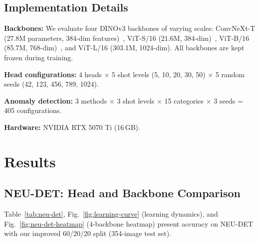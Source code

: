 \documentclass[journal]{IEEEtran}
\begin{document}
\subsection{Implementation Details}
\textbf{Backbones:} We evaluate four DINOv3 backbones of varying scales: ConvNeXt-T (27.8M parameters, 384-dim features)~\cite{ref38}, ViT-S/16 (21.6M, 384-dim)~\cite{ref3,ref9}, ViT-B/16 (85.7M, 768-dim)~\cite{ref3,ref9}, and ViT-L/16 (303.1M, 1024-dim). All backbones are kept frozen during training.

\textbf{Head configurations:} 4 heads $\times$ 5 shot levels (5, 10, 20, 30, 50) $\times$ 5 random seeds (42, 123, 456, 789, 1024).

\textbf{Anomaly detection:} 3 methods $\times$ 3 shot levels $\times$ 15 categories $\times$ 3 seeds = 405 configurations.

\textbf{Hardware:} NVIDIA RTX 5070 Ti (16\,GB).

\section{Results}

\subsection{NEU-DET: Head and Backbone Comparison}
Table~\ref{tab:neu-det}, Fig.~\ref{fig:learning-curve} (learning dynamics), and Fig.~\ref{fig:neu-det-heatmap} (4-backbone heatmap) present accuracy on NEU-DET with our improved 60/20/20 split (354-image test set).
\end{document}
